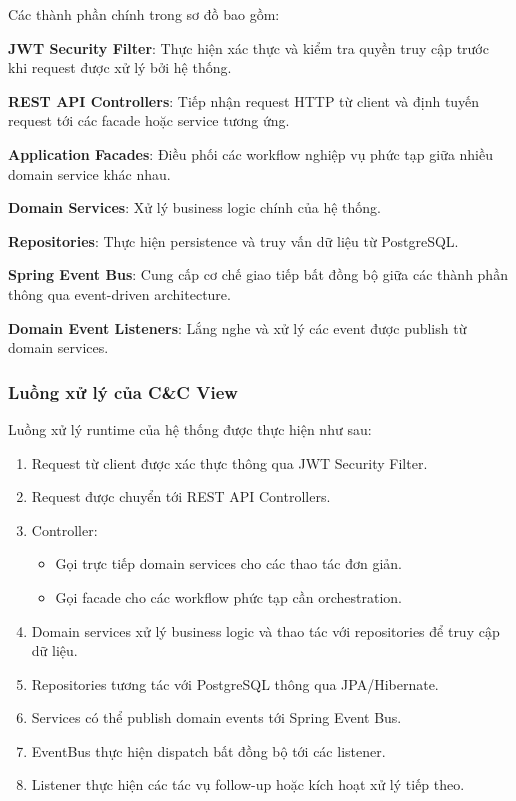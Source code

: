 Các thành phần chính trong sơ đồ bao gồm:

\textbf{JWT Security Filter}:  
Thực hiện xác thực và kiểm tra quyền truy cập trước khi request được xử lý bởi hệ thống.

\textbf{REST API Controllers}:  
Tiếp nhận request HTTP từ client và định tuyến request tới các facade hoặc service tương ứng.

\textbf{Application Facades}:  
Điều phối các workflow nghiệp vụ phức tạp giữa nhiều domain service khác nhau.

\textbf{Domain Services}:  
Xử lý business logic chính của hệ thống.

\textbf{Repositories}:  
Thực hiện persistence và truy vấn dữ liệu từ PostgreSQL.

\textbf{Spring Event Bus}:  
Cung cấp cơ chế giao tiếp bất đồng bộ giữa các thành phần thông qua event-driven architecture.

\textbf{Domain Event Listeners}:  
Lắng nghe và xử lý các event được publish từ domain services.

\subsubsection*{Luồng xử lý của C\&C View}

Luồng xử lý runtime của hệ thống được thực hiện như sau:

\begin{enumerate}
    \item Request từ client được xác thực thông qua JWT Security Filter.
    
    \item Request được chuyển tới REST API Controllers.
    
    \item Controller:
    \begin{itemize}
        \item Gọi trực tiếp domain services cho các thao tác đơn giản.
        \item Gọi facade cho các workflow phức tạp cần orchestration.
    \end{itemize}
    
    \item Domain services xử lý business logic và thao tác với repositories để truy cập dữ liệu.
    
    \item Repositories tương tác với PostgreSQL thông qua JPA/Hibernate.
    
    \item Services có thể publish domain events tới Spring Event Bus.
    
    \item EventBus thực hiện dispatch bất đồng bộ tới các listener.
    
    \item Listener thực hiện các tác vụ follow-up hoặc kích hoạt xử lý tiếp theo.
\end{enumerate}

